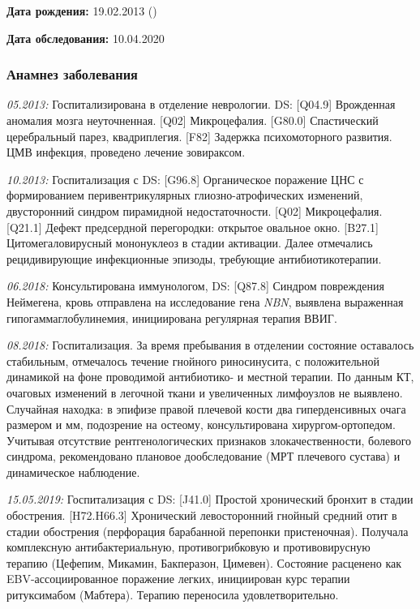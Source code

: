\documentclass[a4paper,14pt]{extarticle}
\newcommand{\mm}{мм}
\newcommand{\genename}[1]{\textit{#1}}
\newcommand{\pdate}[1]{\emph{#1:} }
\newcommand{\DS}[2]{[#2] #1}
\begin{document}
\textbf{Дата рождения:} 19.02.2013 ()

\textbf{Дата обследования:} 10.04.2020

\subsubsection*{Анамнез заболевания}

\pdate{05.2013} Госпитализирована в отделение неврологии. DS: \DS{Врожденная аномалия мозга неуточненная}{Q04.9}. \DS{Микроцефалия}{Q02}. \DS{Спастический церебральный парез, квадриплегия}{G80.0}. \DS{Задержка психомоторного развития}{F82}. ЦМВ инфекция, проведено лечение зовираксом.

\pdate{10.2013} Госпитализация с DS: \DS{Органическое поражение ЦНС с формированием перивентрикулярных глиозно-атрофических изменений, двусторонний синдром пирамидной недостаточности}{G96.8}. \DS{Микроцефалия}{Q02}. \DS{Дефект предсердной перегородки: открытое овальное окно}{Q21.1}. \DS{Цитомегаловирусный мононуклеоз в стадии активации}{B27.1}. 
Далее отмечались рецидивирующие инфекционные эпизоды, требующие антибиотикотерапии. 

\pdate{06.2018} Консультирована иммунологом, DS: \DS{Синдром повреждения Неймегена}{Q87.8}, кровь отправлена на исследование гена \genename{NBN}, выявлена выраженная гипогаммаглобулинемия, инициирована регулярная терапия ВВИГ. 

\pdate{08.2018} Госпитализация. За время пребывания в отделении состояние оставалось стабильным, отмечалось течение гнойного риносинусита, с положительной динамикой на фоне проводимой антибиотико- и местной терапии. По данным КТ, очаговых изменений в легочной ткани и увеличенных лимфоузлов не выявлено. Случайная находка: в эпифизе правой плечевой кости два гиперденсивных очага размером \numprint[\mm]{5} и \numprint[\mm]{2} мм, подозрение на остеому, консультирована хирургом-ортопедом. Учитывая отсутствие рентгенологических признаков злокачественности, болевого синдрома, рекомендовано плановое дообследование (МРТ плечевого сустава) и динамическое наблюдение.

\pdate{15.05.2019} Госпитализация с DS: \DS{Простой хронический бронхит в стадии обострения}{J41.0}. \DS{Хронический левосторонний гнойный средний отит в стадии обострения (перфорация барабанной перепонки пристеночная)}{H72.H66.3}. Получала комплексную антибактериальную, противогрибковую и противовирусную терапию (Цефепим, Микамин, Бакперазон, Цимевен). Состояние расценено как EBV-ассоциированное поражение легких, инициирован курс терапии ритуксимабом (Мабтера). Терапию переносила удовлетворительно.
\end{document}
